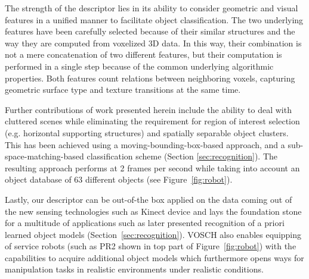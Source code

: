 \documentclass[conference]{sty/IEEEtran}
\begin{document}
The strength of the descriptor lies in its ability to consider geometric and
visual features in a unified manner to facilitate object classification. The two
underlying features have been carefully selected because of their similar structures
and the way they are computed from voxelized 3D data. In this way, their combination is
not a mere concatenation of two different features, but their computation is
performed in a single step because of the common underlying algorithmic
properties. Both features %
count relations between neighboring voxels, capturing geometric surface type and texture
transitions at the same time.

Further contributions of work presented herein include the ability to deal with
cluttered scenes while eliminating the requirement for region of interest
selection (e.g. horizontal supporting structures) and spatially separable object
clusters. This has been achieved using a moving-bounding-box-based approach, and
a sub-space-matching-based classification scheme (Section
\ref{sec:recognition}). The resulting approach performs at 2 frames per second
while taking into account an object database of 63 different objects
(see Figure~\ref{fig:robot}).



Lastly, our descriptor can be out-of-the box applied on the data coming out of the 
new sensing technologies such as Kinect device and lays the foundation stone for a
multitude of applications such as later presented recognition of a priori learned object models
(Section~\ref{sec:recognition}). VOSCH also enables equipping of service robots 
(such as PR2 shown in top part of Figure~\ref{fig:robot}) with the 
capabilities to acquire additional object models which furthermore opens ways 
for manipulation tasks in realistic environments under realistic conditions.
\end{document}
